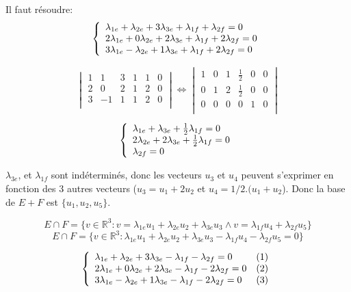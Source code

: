 \documentclass[]{book}
\theoremstyle{definition}
\newcommand{\bb}[1]{\mathbb{#1}}
\newcommand{\R}{\bb{R}}
\begin{document}
Il faut r\'esoudre:
$$
\left\{ 
\begin{array}{l l}
\lambda_{1e} + \lambda_{2e} + 3\lambda_{3e} + \lambda_{1f} + \lambda_{2f} = 0 \\
2\lambda_{1e} + 0\lambda_{2e} + 2\lambda_{3e} + \lambda_{1f} + 2\lambda_{2f} = 0\\
3\lambda_{1e} - \lambda_{2e} + 1\lambda_{3e} + \lambda_{1f} + 2\lambda_{2f} = 0\\
\end{array}
\right. 
$$ 


$$
\begin{vmatrix}
1 & 1  & 3 & 1 & 1 & 0 \\
2 & 0  & 2 & 1 & 2 & 0 \\
3 & -1 & 1 & 1 & 2 & 0 \\
\end{vmatrix}
\Leftrightarrow
\begin{vmatrix}
1 & 0  & 1 & \frac{1}{2} & 0 & 0 \\
0 & 1  & 2 & \frac{1}{2} & 0 & 0 \\
0 & 0 & 0 & 0 & 1 & 0 \\
\end{vmatrix}
$$


$$
\left\{ 
\begin{array}{l l}
\lambda_{1e} + \lambda_{3e} + \frac{1}{2} \lambda_{1f} = 0 \\
2\lambda_{2e} + 2\lambda_{3e} + \frac{1}{2}\lambda_{1f} = 0 \\
\lambda_{2f}= 0 \\
\end{array}
\right. 
$$ 


$\lambda_{3e}$, et $\lambda_{1f}$ sont ind\'etermin\'es, donc les vecteurs $u_3$ et $u_4$ peuvent s'exprimer en fonction des 3 autres vecteurs ($u_3 = u_1 + 2u_2$ et $u_4 = 1/2.(u_1 + u_2$). Donc la base de $E+F$ est $\{u_1, u_2, u_5\}$.



$$E \cap F = \{v \in \R^3: v = \lambda_{1e}u_1 + \lambda_{2e}u_2 + \lambda_{3e}u_3 \land v = \lambda_{1f}u_4 + \lambda_{2f}u_5\}$$  
$$E \cap F = \{v \in \R^3: \lambda_{1e}u_1 + \lambda_{2e}u_2 + \lambda_{3e}u_3 - \lambda_{1f}u_4 - \lambda_{2f}u_5 = 0\}$$  

$$
\left\{ 
\begin{array}{l l}
\lambda_{1e} + \lambda_{2e} + 3\lambda_{3e} - \lambda_{1f} - \lambda_{2f} = 0 & (1)\\
2\lambda_{1e} + 0\lambda_{2e} + 2\lambda_{3e} - \lambda_{1f} - 2\lambda_{2f} = 0 & (2)\\
3\lambda_{1e} - \lambda_{2e} + 1\lambda_{3e} - \lambda_{1f} - 2\lambda_{2f} = 0 & (3)\\
\end{array}
\right. 
$$ 
\end{document}
